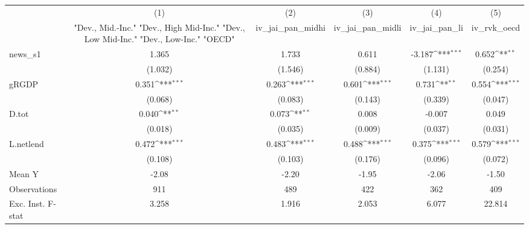 {
\def\sym#1{\ifmmode^{#1}\else\(^{#1}\)\fi}
\begin{tabular}{l*{5}{c}}
\toprule
            &\multicolumn{1}{c}{(1)}&\multicolumn{1}{c}{(2)}&\multicolumn{1}{c}{(3)}&\multicolumn{1}{c}{(4)}&\multicolumn{1}{c}{(5)}\\
            &\multicolumn{1}{c}{ "Dev., Mid.-Inc." "Dev., High Mid-Inc." "Dev., Low Mid-Inc." "Dev., Low-Inc." "OECD" }&\multicolumn{1}{c}{iv\_jai\_pan\_midhi}&\multicolumn{1}{c}{iv\_jai\_pan\_midli}&\multicolumn{1}{c}{iv\_jai\_pan\_li}&\multicolumn{1}{c}{iv\_rvk\_oecd}\\
\midrule
news\_s1     &       1.365         &       1.733         &       0.611         &      -3.187\sym{***}&       0.652\sym{**} \\
            &     (1.032)         &     (1.546)         &     (0.884)         &     (1.131)         &     (0.254)         \\
\addlinespace
gRGDP       &       0.351\sym{***}&       0.263\sym{***}&       0.601\sym{***}&       0.731\sym{**} &       0.554\sym{***}\\
            &     (0.068)         &     (0.083)         &     (0.143)         &     (0.339)         &     (0.047)         \\
\addlinespace
D.tot       &       0.040\sym{**} &       0.073\sym{**} &       0.008         &      -0.007         &       0.049         \\
            &     (0.018)         &     (0.035)         &     (0.009)         &     (0.037)         &     (0.031)         \\
\addlinespace
L.netlend   &       0.472\sym{***}&       0.483\sym{***}&       0.488\sym{***}&       0.375\sym{***}&       0.579\sym{***}\\
            &     (0.108)         &     (0.103)         &     (0.176)         &     (0.096)         &     (0.072)         \\
\midrule
Mean Y      &       -2.08         &       -2.20         &       -1.95         &       -2.06         &       -1.50         \\
Observations&         911         &         489         &         422         &         362         &         409         \\
Exc. Inst. F-stat&       3.258         &       1.916         &       2.053         &       6.077         &      22.814         \\
\bottomrule
\end{tabular}
}
